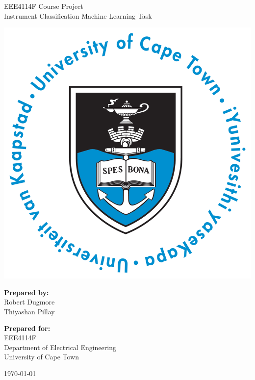 \thispagestyle{empty}
\begin{center}
    
\Huge

\vspace{5cm}

EEE4114F Course Project\\Instrument Classification Machine Learning Task

\vspace{2.5cm}

\includegraphics[width=0.4\linewidth]{FrontMatter/UCT_logo.png}

\vfill

\large
\textbf{Prepared by:}\\
Robert Dugmore \\
Thiyashan Pillay \\

\vspace{1cm}

\textbf{Prepared for:}\\
EEE4114F\\
Department of Electrical Engineering\\
University of Cape Town

\vspace{2cm}

\today


\end{center}

\newpage